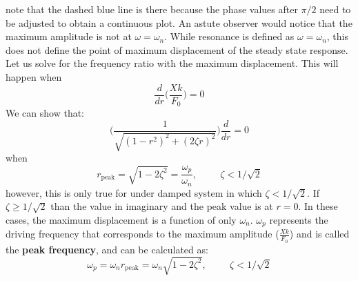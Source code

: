 \documentclass[12pt,letter]{article}
\numberwithin{ex}{section} %
\numberwithin{re}{section} %
\numberwithin{vcs}{section} %
\begin{document}
			\noindent note that the dashed blue line is there because the phase values after $\pi/2$ need to be adjusted to obtain a continuous plot. An astute observer would notice that the maximum amplitude is not at $\omega = \omega_n$. While resonance is defined as $\omega = \omega_n$, this does not define the point of maximum displacement of the steady state response. Let us solve for the frequency ratio with the maximum displacement. This will happen when
			\begin{equation}
				\frac{d}{dr}\Bigg(\frac{Xk}{F_0} \Bigg)= 0
			\end{equation}				
			We can show that:
			\begin{equation}
			\Bigg(\frac{1}{\sqrt{(1-r^2)^2+(2\zeta r)^2}}\Bigg)	\frac{d}{dr} =0
			\end{equation}	
			when 
			\begin{equation}
			r_{\text{peak}} = \sqrt{1-2 \zeta^2}= \frac{\omega_p}{\omega_n}, \hspace{1cm} \zeta<1/\sqrt{2} 
			\end{equation}				
			however, this is only true for under damped system in which $\zeta<1/\sqrt{2}$. If $\zeta \ge 1/\sqrt{2}$ than the value in imaginary and the peak value is at $r=0$. In these cases, the maximum displacement is a function of only $\omega_n$. $\omega_p$ represents the driving frequency that corresponds to the maximum amplitude ($\frac{Xk}{F_0}$) and is called the \textbf{peak frequency}, and can be calculated as:
			\begin{equation}
			\omega_p = \omega_n r_{\text{peak}} = \omega_n \sqrt{1-2 \zeta^2}, \hspace{1cm} \zeta<1/\sqrt{2} 
			\end{equation}				
			
			
			
\end{document}
